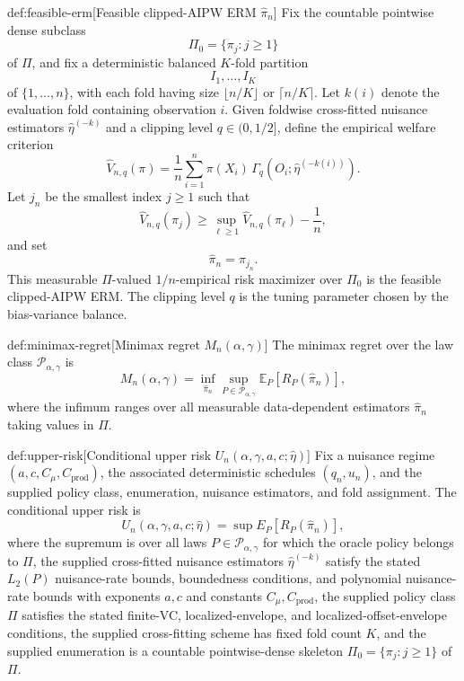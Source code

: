 \begin{definitionv}{def:feasible-erm}[Feasible clipped-AIPW ERM $\widehat\pi_n$]
Fix the countable pointwise dense subclass
\[
\Pi_0=\{\pi_j:j\ge 1\}
\]
of \(\Pi\), and fix a deterministic balanced \(K\)-fold partition
\[
I_1,\ldots,I_K
\]
of \(\{1,\ldots,n\}\), with each fold having size \(\lfloor n/K\rfloor\) or \(\lceil n/K\rceil\). Let \(k(i)\) denote the evaluation fold containing observation \(i\). Given foldwise cross-fitted nuisance estimators \(\widehat\eta^{(-k)}\) and a clipping level \(q\in(0,1/2]\), define the empirical welfare criterion
\[
\widehat V_{n,q}(\pi)
=
\frac1n\sum_{i=1}^n
\pi(X_i)\,
\Gamma_q\!\left(O_i;\widehat\eta^{(-k(i))}\right).
\]
Let \(j_n\) be the smallest index \(j\ge1\) such that
\[
\widehat V_{n,q}(\pi_j)
\ge
\sup_{\ell\ge1}\widehat V_{n,q}(\pi_\ell)-\frac1n,
\]
and set
\[
\widehat\pi_n=\pi_{j_n}.
\]
This measurable \(\Pi\)-valued \(1/n\)-empirical risk maximizer over \(\Pi_0\) is the feasible clipped-AIPW ERM. The clipping level \(q\) is the tuning parameter chosen by the bias-variance balance.
\end{definitionv}

\begin{definitionv}{def:minimax-regret}[Minimax regret $M_n(\alpha,\gamma)$]
The minimax regret over the law class \(\mathcal P_{\alpha,\gamma}\) is
\[
M_n(\alpha,\gamma)
=
\inf_{\widehat\pi_n}
\sup_{P\in\mathcal P_{\alpha,\gamma}}
\mathbb E_P\!\left[
R_P(\widehat\pi_n)
\right],
\]
where the infimum ranges over all measurable data-dependent estimators \(\widehat\pi_n\) taking values in \(\Pi\).
\end{definitionv}

\begin{definitionv}{def:upper-risk}[Conditional upper risk \(U_n(\alpha,\gamma,a,c;\widehat\eta)\)]
Fix a nuisance regime \((a,c,C_\mu,C_{\mathrm{prod}})\), the associated deterministic schedules \((q_n,u_n)\), and the supplied policy class, enumeration, nuisance estimators, and fold assignment. The conditional upper risk is
\[
U_n(\alpha,\gamma,a,c;\widehat\eta)
=
\sup E_P\!\left[R_P(\widehat\pi_n)\right],
\]
where the supremum is over all laws \(P\in\mathcal P_{\alpha,\gamma}\) for which the oracle policy belongs to \(\Pi\), the supplied cross-fitted nuisance estimators \(\widehat\eta^{(-k)}\) satisfy the stated \(L_2(P)\) nuisance-rate bounds, boundedness conditions, and polynomial nuisance-rate bounds with exponents \(a,c\) and constants \(C_\mu,C_{\mathrm{prod}}\), the supplied policy class \(\Pi\) satisfies the stated finite-VC, localized-envelope, and localized-offset-envelope conditions, the supplied cross-fitting scheme has fixed fold count \(K\), and the supplied enumeration is a countable pointwise-dense skeleton \(\Pi_0=\{\pi_j:j\ge1\}\) of \(\Pi\).
\end{definitionv}

